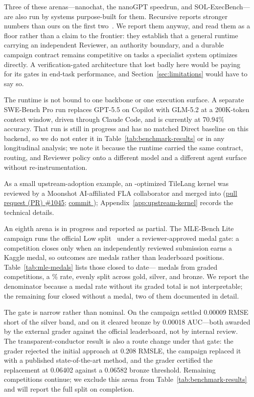 Three of these arenas---nanochat, the nanoGPT speedrun, and SOL-ExecBench---are also
run by systems purpose-built for them. Recursive reports stronger numbers than ours on
the first two~\citep{recursive2026firststeps}. We report them anyway, and read them as
a floor rather than a claim to the frontier: they establish that a general runtime
carrying an independent Reviewer, an authority boundary, and a durable campaign
contract remains competitive on tasks a specialist system optimizes directly. A
verification-gated architecture that lost badly here would be paying for its gates in
end-task performance, and Section~\ref{sec:limitations} would have to say so.

The runtime is not bound to one backbone or one execution surface. A separate
SWE-Bench Pro run replaces GPT-5.5 on Copilot with GLM-5.2 at a 200K-token context
window, driven through Claude Code, and is currently at 70.94\% accuracy. That run
is still in progress and has no matched Direct baseline on this backend, so we do
not enter it in Table~\ref{tab:benchmark-results} or in any longitudinal analysis;
we note it because the runtime carried the same contract, routing, and Reviewer
policy onto a different model and a different agent surface without
re-instrumentation.

As a small upstream-adoption example, an \systemname-optimized TileLang
 kernel was reviewed by a Moonshot AI-affiliated FLA collaborator and
merged into 
(\href{https://github.com/fla-org/flash-linear-attention/pull/1045}{pull request (PR) \#1045};
\href{https://github.com/fla-org/flash-linear-attention/commit/c70f11c5530142450525549cc96d13d9f5165f69}
{commit }); Appendix~\ref{app:upstream-kernel} records the technical
details.

An eighth arena is in progress and reported as partial. The MLE-Bench Lite campaign
runs the official Low split~\citep{chan2024mlebench} under a reviewer-approved medal
gate: a competition closes only when an independently reviewed submission earns a
Kaggle medal, so outcomes are medals rather than leaderboard positions.
Table~\ref{tab:mle-medals} lists those closed to date---\MLEMedals{} medals from
\MLEGraded{} graded competitions, a \MLEMedalRate\% rate, evenly split across gold,
silver, and bronze. We report the denominator because a medal rate without its graded
total is not interpretable; the remaining four closed without a medal, two of them
documented in detail.

The gate is narrow rather than nominal. On  the
campaign settled 0.00009 RMSE short of the silver band, and on
 it cleared bronze by 0.00018
AUC---both awarded by the external grader against the official leaderboard, not by
internal review. The transparent-conductor result is also a route change under that
gate: the grader rejected the initial approach at 0.208 RMSLE, the campaign replaced
it with a published state-of-the-art method, and the grader certified the replacement
at 0.06402 against a 0.06582 bronze threshold. Remaining competitions continue; we
exclude this arena from Table~\ref{tab:benchmark-results} and will report the full
split on completion.

